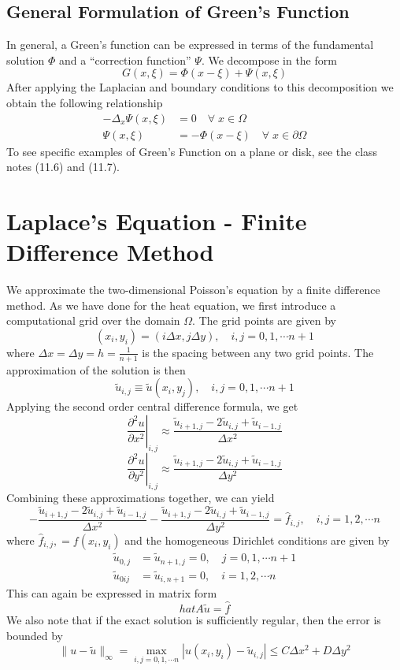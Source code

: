 \documentclass[11pt]{article}
\begin{document}
\subsection{General Formulation of Green's Function}
In general, a Green’s function can be expressed in terms of the fundamental solution $\Phi$ and a “correction function” $\Psi$. We decompose in the form 
$$G(x, \xi) = \Phi (x-\xi) + \Psi (x, \xi) $$ After applying the Laplacian and boundary conditions to this decomposition we obtain the following relationship 
\begin{align*}
- \Delta_x \Psi (x, \xi) &= 0 \quad \forall \; x \in \Omega \\
                  \Psi (x, \xi) &= - \Phi (x-\xi) \quad \forall \; x \in \partial \Omega 
\end{align*}
To see specific examples of Green's Function on a plane or disk, see the class notes (11.6) and (11.7).


\pagebreak

\section{Laplace's Equation - Finite Difference Method}
We approximate the two-dimensional Poisson’s equation by a finite difference method. As we have done for the heat equation, we first introduce a computational grid over the domain $\Omega$. The grid points are given by
$$ (x_i, y_i) = (i\Delta x, j \Delta y), \quad i,j = 0,1, \cdots n+1$$
where $\Delta x = \Delta y = h = \frac{1}{n + 1}$ is the spacing between any two grid points. The approximation of the solution is then
$$\tilde{u}_{i,j} \equiv \tilde{u}(x_i, y_j), \quad i,j=0,1, \cdots n+1$$
Applying the second order central difference formula, we get 
$$ \left. \frac{\partial^2 u}{\partial x^2} \right|_{i,j} \approx \frac{\tilde{u}_{i+1,j} - 2\tilde{u}_{i,j} + \tilde{u}_{i-1,j}}{\Delta x^2}$$
$$ \left. \frac{\partial^2 u}{\partial y^2} \right|_{i,j} \approx \frac{\tilde{u}_{i+1,j} - 2\tilde{u}_{i,j} + \tilde{u}_{i-1,j}}{\Delta y^2}$$
Combining these approximations together, we can yield 
$$- \frac{\tilde{u}_{i+1,j} - 2\tilde{u}_{i,j} + \tilde{u}_{i-1,j}}{\Delta x^2} - \frac{\tilde{u}_{i+1,j} - 2\tilde{u}_{i,j} + \tilde{u}_{i-1,j}}{\Delta y^2} = \hat{f}_{i,j}, \quad i,j = 1,2, \cdots n$$ where $\hat{f}_{i,j}, = f(x_i, y_i)$ and the homogeneous Dirichlet conditions are given by
\begin{align*}
 \tilde{u}_{0,j} &= \tilde{u}_{n+1, j} = 0, \quad j=0,1, \cdots n+1 \\
 \tilde{u}_{0ij} &= \tilde{u}_{i, n+1} = 0, \quad i=1, 2,\cdots n
\end{align*}
This can again be expressed in matrix form 
$$ hat{A} \tilde{u} = \hat{f}$$
We also note that if the exact solution is sufficiently regular, then the error is bounded by
$$ \|u-\tilde{u} \|_{\infty} = \max_{i,j=0,1, \cdots n} | u(x_i, y_i) - \tilde{u}_{i,j} | \leq C\Delta x^2 + D \Delta y^2 $$
\pagebreak
\end{document}
